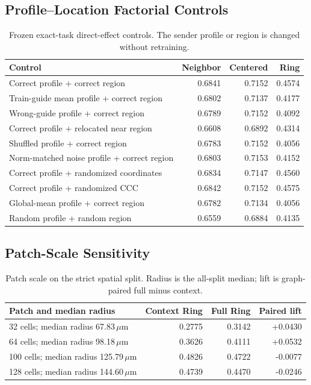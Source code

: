 \subsection{Profile--Location Factorial Controls}
\label{app:profile_location_factorial}
\begin{table}[h]
\centering\scriptsize
\caption{Frozen exact-task direct-effect controls. The sender profile or region is changed without retraining.}
\label{tab:app_profile_location}
\begin{tabular}{lrrr}
\toprule
Control & Neighbor & Centered & Ring \\
\midrule
Correct profile + correct region & 0.6841 & 0.7152 & 0.4574 \\
Train-guide mean profile + correct region & 0.6802 & 0.7137 & 0.4177 \\
Wrong-guide profile + correct region & 0.6789 & 0.7152 & 0.4092 \\
Correct profile + relocated near region & 0.6608 & 0.6892 & 0.4314 \\
Shuffled profile + correct region & 0.6783 & 0.7152 & 0.4056 \\
Norm-matched noise profile + correct region & 0.6803 & 0.7153 & 0.4152 \\
Correct profile + randomized coordinates & 0.6834 & 0.7147 & 0.4560 \\
Correct profile + randomized CCC & 0.6842 & 0.7152 & 0.4575 \\
Global-mean profile + correct region & 0.6782 & 0.7134 & 0.4056 \\
Random profile + random region & 0.6559 & 0.6884 & 0.4135 \\
\bottomrule
\end{tabular}
\end{table}

\subsection{Patch-Scale Sensitivity}
\label{app:patch_scale}
\begin{table}[h]
\centering\scriptsize
\caption{Patch scale on the strict spatial split. Radius is the all-split median; lift is graph-paired full minus context.}
\label{tab:app_patch_scale}
\begin{tabular}{lrrr}
\toprule
Patch and median radius & Context Ring & Full Ring & Paired lift \\
\midrule
32 cells; median radius 67.83\,$\mu$m & 0.2775 & 0.3142 & +0.0430 \\
64 cells; median radius 98.18\,$\mu$m & 0.3626 & 0.4111 & +0.0532 \\
100 cells; median radius 125.79\,$\mu$m & 0.4826 & 0.4722 & -0.0077 \\
128 cells; median radius 144.60\,$\mu$m & 0.4739 & 0.4470 & -0.0246 \\
\bottomrule
\end{tabular}
\end{table}

